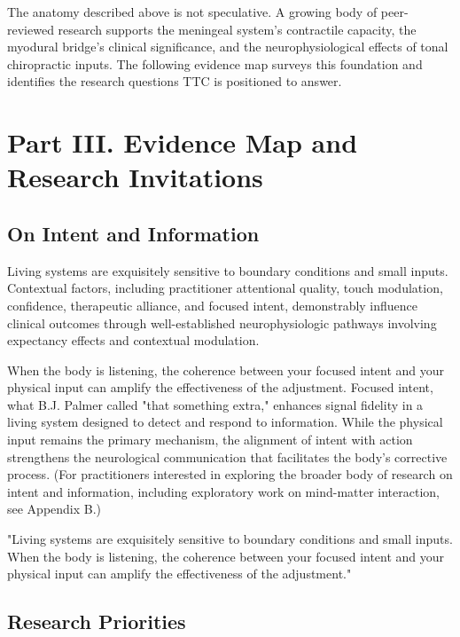 \documentclass[11pt,letterpaper]{article}
\begin{document}
The anatomy described above is not speculative. A growing body of peer-reviewed research supports the meningeal system's contractile capacity, the myodural bridge's clinical significance, and the neurophysiological effects of tonal chiropractic inputs. The following evidence map surveys this foundation and identifies the research questions TTC is positioned to answer.


\section{Part III. Evidence Map and Research Invitations}


\subsection{On Intent and Information}

Living systems are exquisitely sensitive to boundary conditions and small inputs. Contextual factors, including practitioner attentional quality, touch modulation, confidence, therapeutic alliance, and focused intent, demonstrably influence clinical outcomes through well-established neurophysiologic pathways involving expectancy effects and contextual modulation.


When the body is listening, the coherence between your focused intent and your physical input can amplify the effectiveness of the adjustment. Focused intent, what B.J. Palmer called "that something extra," enhances signal fidelity in a living system designed to detect and respond to information. While the physical input remains the primary mechanism, the alignment of intent with action strengthens the neurological communication that facilitates the body's corrective process. (For practitioners interested in exploring the broader body of research on intent and information, including exploratory work on mind-matter interaction, see Appendix B.)


\begin{pullquotebox}
"Living systems are exquisitely sensitive to boundary conditions and small inputs. When the body is listening, the coherence between your focused intent and your physical input can amplify the effectiveness of the adjustment."
\end{pullquotebox}


\subsection{Research Priorities}
\end{document}

